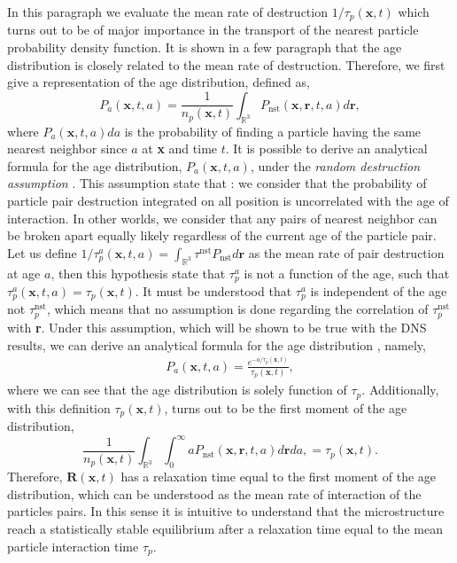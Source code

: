 In this paragraph we evaluate the mean rate of destruction $1/\tau_p(\textbf{x},t)$ which turns out to be of major importance in the transport of the nearest particle probability density function. 
It is shown in a few paragraph that the age distribution is closely related to the mean rate of destruction. 
Therefore, we first give a representation of the age distribution, defined as, 
\begin{equation*}
    P_a(\textbf{x},t,a)
    = \frac{1}{n_p(\textbf{x},t)}
    \int_{\mathbb{R}^3}
    P_\text{nst}(\textbf{x},\textbf{r},t,a)
    d\textbf{r},
\end{equation*} 
where $P_a(\textbf{x},t,a) da$ is the probability of finding a particle having the same nearest neighbor since $a$  at \textbf{x} and time $t$. 
It is possible to derive an analytical formula for the age distribution, $P_a(\textbf{x},t,a)$, under the \textit{random destruction assumption} \citep{zhang2023evolution}.
This assumption state that : we consider that the probability of particle pair destruction integrated on all position is uncorrelated with the age of interaction.
In other worlds, we consider that any pairs of nearest neighbor can be broken apart equally likely regardless of the current age of the particle pair. 
Let us define $1/\tau_p^a(\textbf{x},t,a) = \int_{\mathbb{R}^3}\tau^\text{nst} P_\text{nst}d\textbf{r}$ as the mean rate of pair destruction at age $a$, then this hypothesis state that $\tau^a_p$ is not a function of the age, such that $\tau^a_p(\textbf{x},t,a) = \tau_p(\textbf{x},t)$. 
It must be understood that $\tau^a_p$ is independent of the age not $\tau^\text{nst}_p$, which means that no assumption is done regarding the correlation of $\tau^\text{nst}_p$ with \textbf{r}.
Under this assumption, which will be shown to be true with the DNS results, 
we can derive an analytical formula for the age distribution \citep{zhang2023evolution}, namely,
\begin{align}
    P_a(\textbf{x},t, a)  
    =\frac{e^{-a/\tau_p(\textbf{x},t)}}{\tau_p(\textbf{x},t)},
    \label{eq:Pa}
\end{align} 
where we can see that the age distribution is solely function of $\tau_p$.
Additionally, with this definition $\tau_p(\textbf{x},t)$, turns out to be the first moment of the age distribution, 
\begin{equation*}
    \frac{1}{n_p(\textbf{x},t)}\int_{\mathbb{R}^3}
    \int_{0}^\infty
    a P_\text{nst}(\textbf{x},\textbf{r},t,a)
    d\textbf{r}da, 
    =\tau_p(\textbf{x},t). 
\end{equation*}
Therefore, $\textbf{R}(\textbf{x},t)$ has a relaxation time equal to the first moment of the age distribution, which can be understood as the mean rate of interaction of the particles pairs. 
In this sense it is intuitive to understand that the microstructure reach a statistically stable equilibrium after a relaxation time equal to the mean particle interaction time $\tau_p$. 

